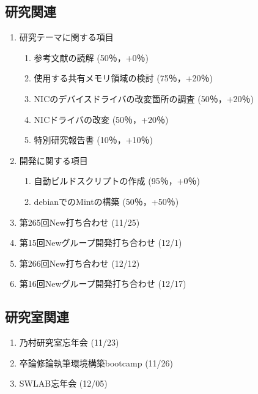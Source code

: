 \documentclass[fleqn, 14pt]{extarticle}
\begin{document}
\subsection{研究関連}
\label{sec-2-1}
\begin{enumerate}
    \item 研究テーマに関する項目
    \hfill
    \label{enum-research1}
    \begin{enumerate}

        \item 参考文献の読解
        \hfill
        \label{enum-1-A}
        (50％，+0％)
        \item 使用する共有メモリ領域の検討
        \hfill
        \label{enum-1-B}
        (75％，+20％)
        \item NICのデバイスドライバの改変箇所の調査
        \hfill
        \label{enum-1-C}
        (50％，+20％)
        \item NICドライバの改変
        \hfill
        \label{enum-1-D}
        (50％，+20％)
        \item 特別研究報告書
        \hfill
        \label{enum-1-E}
        (10％，+10％)

    \end{enumerate}
    \item 開発に関する項目
    \hfill
    \label{enum-research2}
    \begin{enumerate}

        \item 自動ビルドスクリプトの作成
        \hfill
        \label{enum-2-A}
        (95％，+0％)
        \item debianでのMintの構築
        \hfill
        \label{enum-2-A}
        (50％，+50％)
    \end{enumerate}
    \item 第265回New打ち合わせ 
    \hfill
    \label{enum-research3}
    (11/25)
    \item 第15回Newグループ開発打ち合わせ
    \hfill
    \label{enum-research4}
    (12/1)
    \item 第266回New打ち合わせ
    \hfill
    \label{enum-research5}
    (12/12)
    \item 第16回Newグループ開発打ち合わせ
    \hfill
    \label{enum-research6}
    (12/17)   

\end{enumerate}

\subsection{研究室関連}
\label{sec-2-2}
\begin{enumerate}
\item 乃村研究室忘年会
\hfill
\label{enum-lab1}
(11/23)
\item 卒論修論執筆環境構築bootcamp
\hfill
\label{enum-lab3}
(11/26)
\item SWLAB忘年会
\hfill
\label{enum-lab2}
(12/05)
\end{enumerate}
\end{document}
